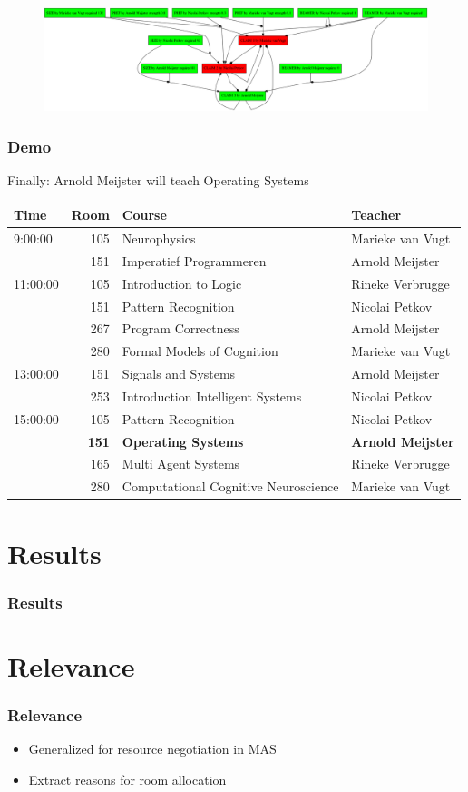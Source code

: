 \documentclass{beamer}
\begin{document}
\begin{frame}[plain]
	\begin{figure}
		\includegraphics[keepaspectratio,width=\textwidth,height=\textheight,]{demo/5}
	\end{figure}
\end{frame}

\begin{frame}
	\frametitle{Demo}
	Finally: Arnold Meijster will teach Operating Systems
	\fontsize{6}{7.2}\selectfont
	\begin{table}
		\begin{tabular}{l|r|l|l}
			Time & Room & Course & Teacher \\ \hline
			\hline
			9:00:00 & 105 & Neurophysics & Marieke van Vugt\\
			& 151 & Imperatief Programmeren & Arnold Meijster\\
			\hline
			11:00:00 & 105 & Introduction to Logic & Rineke Verbrugge\\
			& 151 & Pattern Recognition & Nicolai Petkov\\
			& 267 & Program Correctness & Arnold Meijster\\
			& 280 & Formal Models of Cognition & Marieke van Vugt\\ \hline
			13:00:00 & 151 & Signals and Systems & Arnold Meijster\\
			& 253 & Introduction Intelligent Systems & Nicolai Petkov\\\hline
			15:00:00 & 105 & Pattern Recognition & Nicolai Petkov\\
			& \textbf{151} & \textbf{Operating Systems} & \textbf{Arnold Meijster}\\
			& 165 & Multi Agent Systems & Rineke Verbrugge\\
			& 280 & Computational Cognitive Neuroscience & Marieke van Vugt\\
		\end{tabular}
	\end{table}
\end{frame}

\section{Results}
\begin{frame}
	\frametitle{Results}
\end{frame}

\section{Relevance}
\begin{frame}
	\frametitle{Relevance}
        \begin{itemize}[<+->]
            \item Generalized for resource negotiation in MAS
            \item Extract reasons for room allocation
        \end{itemize}
\end{frame}

\end{document}
